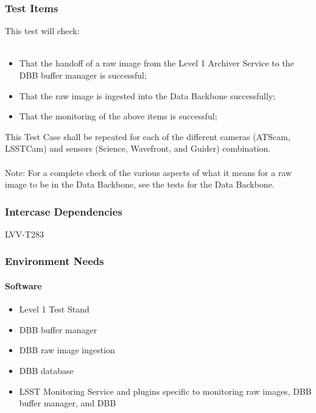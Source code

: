 \subsubsection{Test Items}
This test will check:\\
~\\

\begin{itemize}
\tightlist
\item
  That the handoff of a raw image from the Level 1 Archiver Service to
  the DBB buffer manager is successful;
\item
  That the raw image is ingested into the Data Backbone successfully;
\item
  That the monitoring of the above items is successful;
\end{itemize}

This Test Case shall be repeated for each of the different cameras
(ATScam, LSSTCam) and sensors (Science, Wavefront, and Guider)
combination.\\
~\\
Note: For a complete check of the various aspects of what it means for a
raw image to be in the Data Backbone, see the tests for the Data
Backbone.



\subsubsection{Intercase Dependencies}
LVV-T283


\subsubsection{Environment Needs}

\paragraph{Software}
\begin{itemize}
\tightlist
\item
  Level 1 Test Stand
\item
  DBB buffer manager
\item
  DBB raw image ingestion
\item
  DBB database
\item
  LSST Monitoring Service and plugins specific to monitoring raw images,
  DBB buffer manager, and DBB
\end{itemize}


